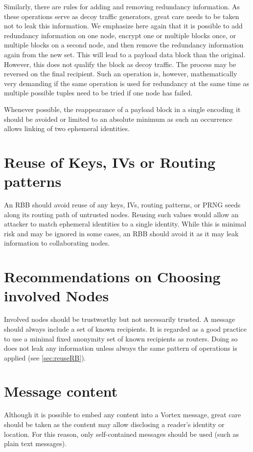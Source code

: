 Similarly, there are rules for adding and removing redundancy information. As these operations serve as decoy traffic generators, great care needs to be taken not to leak this information. We emphasize here again that it is possible to add redundancy information on one node, encrypt one or multiple blocks once, or multiple blocks on a second node, and then remove the redundancy information again from the new set. This will lead to a payload data block than the original. However, this does not qualify the block as decoy traffic. The process may be reversed on the final recipient. Such an operation is, however, mathematically very demanding if the same operation is used for redundancy at the same time as multiple possible tuples need to be tried if one node has failed.

Whenever possible, the reappearance of a payload block in a single encoding it should be avoided or limited to an absolute minimum as such an occurrence allows linking of two ephemeral identities.

\section{Reuse of Keys, IVs or Routing patterns}
An RBB should avoid reuse of any keys, IVs, routing patterns, or PRNG seeds along its routing path of untrusted nodes. Reusing such values would allow an attacker to match ephemeral identities to a single identity. While this is minimal risk and may be ignored in some cases, an RBB should avoid it as it may leak information to collaborating nodes.

\section{Recommendations on Choosing involved Nodes}
Involved nodes should be trustworthy but not necessarily trusted. A message should always include a set of known recipients. It is regarded as a good practice to use a minimal fixed anonymity set of known recipients as routers. Doing so does not leak any information unless always the same pattern of operations is applied (see \ref{sec:reuseRB}).

\section{Message content}
Although it is possible to embed any content into a Vortex message, great care should be taken as the content may allow disclosing a reader's identity or location. For this reason, only self-contained messages should be used (such as plain text messages).

